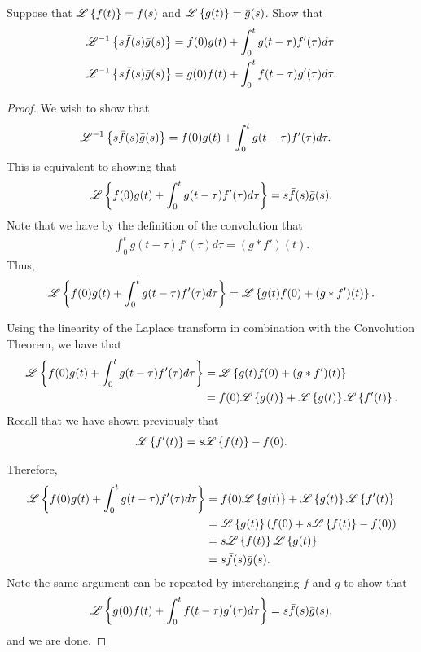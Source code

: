 \begin{problem}{3.29}
  Suppose that $\mathscr{L}\left\{ {f(t)} \right\} = \bar{f}(s)$ and $\mathscr{L}\left\{ {g(t)} \right\} = \bar{g}(s)$.
  Show that
  \begin{align*}
    \mathscr{L}^{-1}\left\{ {s \bar{f}(s) \bar{g}(s)} \right\} &= f(0)g(t) + \int_0^t g(t-\tau) f'(\tau) d\tau \\
    \mathscr{L}^{-1}\left\{ {s \bar{f}(s) \bar{g}(s)} \right\} &= g(0)f(t) + \int_0^t f(t-\tau) g'(\tau) d\tau.
  \end{align*}
\end{problem}

\begin{proof}
  We wish to show that
  \begin{align*}
    \mathscr{L}^{-1}\left\{ {s \bar{f}(s) \bar{g}(s)} \right\} &= f(0)g(t) + \int_0^t g(t-\tau) f'(\tau) d\tau.
  \end{align*}
  This is equivalent to showing that
  \begin{align*}
    \mathscr{L}\left\{ {f(0)g(t) + \int_0^t g(t-\tau)  f'(\tau) d\tau} \right\} = s\bar{f}(s)\bar{g}(s).
  \end{align*}
  Note that we have by the definition of the convolution that
  \begin{align*}
    \int_0^t g(t-\tau)  f'(\tau) d\tau = (g \ast f')(t).
  \end{align*}
  Thus,
  \begin{align*}
    \mathscr{L}\left\{ {f(0)g(t) + \int_0^t g(t-\tau)  f'(\tau) d\tau} \right\} = \mathscr{L}\left\{ {g(t)f(0) + (g \ast f')(t)} \right\}.
  \end{align*}

  Using the linearity of the Laplace transform in combination with the Convolution Theorem, we have that
  \begin{align*}
    \mathscr{L}\left\{ {f(0)g(t) + \int_0^t g(t-\tau)  f'(\tau) d\tau} \right\}
    &= \mathscr{L}\left\{ {g(t)f(0) + (g \ast f')(t)} \right\} \\
    &= f(0) \mathscr{L}\left\{ {g(t)} \right\} + \mathscr{L}\left\{ {g(t)} \right\}\mathscr{L}\left\{ {f'(t)} \right\}.
  \end{align*}
  Recall that we have shown previously that
  \begin{align*}
    \mathscr{L}\left\{ {f'(t)} \right\} = s\mathscr{L}\left\{ {f(t)} \right\} - f(0).
  \end{align*}

  Therefore,
  \begin{align*}
    \mathscr{L}\left\{ {f(0)g(t) + \int_0^t g(t-\tau)  f'(\tau) d\tau} \right\}
    &= f(0) \mathscr{L}\left\{ {g(t)} \right\} + \mathscr{L}\left\{ {g(t)} \right\}\mathscr{L}\left\{ {f'(t)} \right\} \\
    &=\mathscr{L}\left\{ {g(t)} \right\}\left(f(0) + s \mathscr{L}\left\{ {f(t)} \right\} - f(0)\right) \\
    &= s\mathscr{L}\left\{ {f(t)} \right\}\mathscr{L}\left\{ {g(t)} \right\} \\
    &= s\bar{f}(s)\bar{g}(s).
  \end{align*}
  Note the same argument can be repeated by interchanging $f$ and $g$ to show that
  \begin{align*}
    \mathscr{L}\left\{ {g(0)f(t) + \int_0^t f(t-\tau) g'(\tau) d\tau} \right\} = s \bar{f}(s) \bar{g}(s),
  \end{align*}
  and we are done.
\end{proof}
\newpage
